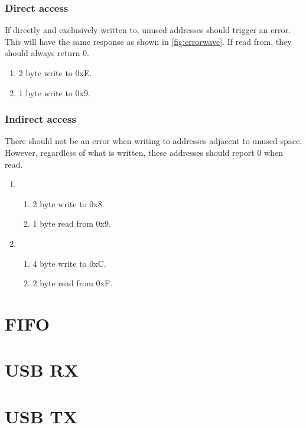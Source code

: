 \documentclass{scrartcl}
\begin{document}
\subsubsection{Direct access}
If directly and exclusively written to, unused addresses should trigger an error. This will have the same response as shown in \autoref{fig:errorwave}. If read from, they should always return 0.

\begin{enumerate}
    \item 2 byte write to 0xE.
    \item 1 byte write to 0x9.
\end{enumerate}

\subsubsection{Indirect access}
There should not be an error when writing to addresses adjacent to unused space. However, regardless of what is written, these addresses should report 0 when read.

\begin{enumerate}
    \item
    \begin{enumerate}
        \item 2 byte write to 0x8.
        \item 1 byte read from 0x9.
    \end{enumerate}
    \item
    \begin{enumerate}
        \item 4 byte write to 0xC.
        \item 2 byte read from 0xF.
    \end{enumerate}
\end{enumerate}

\section{FIFO}

\section{USB RX}

\section{USB TX}
\end{document}
